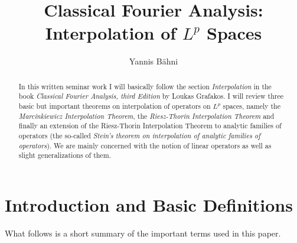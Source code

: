 

\begin{abstract}
	In this written seminar work I will basically follow the section \emph{Interpolation} in the book \emph{Classical Fourier Analysis, third Edition} by Loukas Grafakos. I will review three basic but important theorems on interpolation of operators on $L^p$ spaces, namely the \emph{Marcinkiewicz Interpolation Theorem}, the \emph{Riesz-Thorin Interpolation Theorem} and finally an extension of the Riesz-Thorin Interpolation Theorem to analytic families of operators (the so-called \emph{Stein's theorem on interpolation of analytic families of operators}). We are mainly concerned with the notion of linear operators as well as slight generalizations of them. 
\end{abstract}

\title{Classical Fourier Analysis: Interpolation of $L^p$ Spaces}
\author{Yannis B\"{a}hni}
\address[Yannis B\"{a}hni]{University of Zurich, R\"{a}mistrasse 71, 8006 Zurich}
\maketitle

\tableofcontents
\newpage

\mainsectionstyle

\section{Introduction and Basic Definitions}
What follows is a short summary of the important terms used in this paper.

